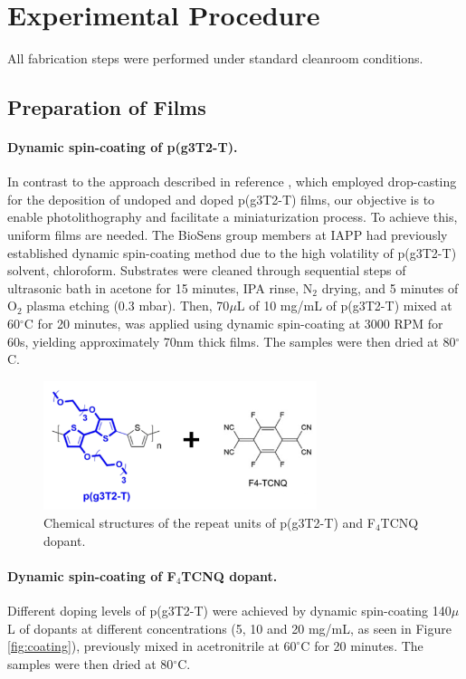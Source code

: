 \section{Experimental Procedure}

All fabrication steps were performed under standard cleanroom conditions.
\subsection{Preparation of Films} \label{subsec:films}
\paragraph{Dynamic spin-coating of p(g3T2-T).} In contrast to the approach described in reference \cite{tanTuningOrganicElectrochemical2022}, which employed drop-casting for the deposition of undoped and doped p(g3T2-T) films, our objective is to enable photolithography and facilitate a miniaturization process. To achieve this, uniform films are needed. The BioSens group members at IAPP had previously established dynamic spin-coating method due to the high volatility of p(g3T2-T) solvent, chloroform. Substrates were cleaned through sequential steps of ultrasonic bath in acetone for 15 minutes, IPA rinse, N$_{2}$ drying, and 5 minutes of O$_{2}$ plasma etching (0.3 mbar). Then, 70$\mu$L of 10 mg/mL of p(g3T2-T) mixed at 60$^{\circ}$C for 20 minutes, was applied using dynamic spin-coating at 3000 RPM for 60s, yielding approximately 70nm thick films. The samples were then dried at 80$^{\circ}$C.

\begin{figure}[ht]
  \centering
  \includegraphics[width=8cm]{Images/pdf/doping_formulas1.pdf}
  \caption{Chemical structures of the repeat units of p(g3T2-T) and F$_{4}$TCNQ dopant.}
  \label{fig:dop1}
\end{figure}

\paragraph{Dynamic spin-coating of F$_{4}$TCNQ dopant.}Different doping levels of p(g3T2-T) were achieved by dynamic spin-coating 140$\mu$L of dopants at different concentrations (5, 10 and 20 mg/mL, as seen in Figure \ref{fig:coating}), previously mixed in acetronitrile at $60^{\circ}$C for 20 minutes. The samples were then dried at 80$^{\circ}$C.

